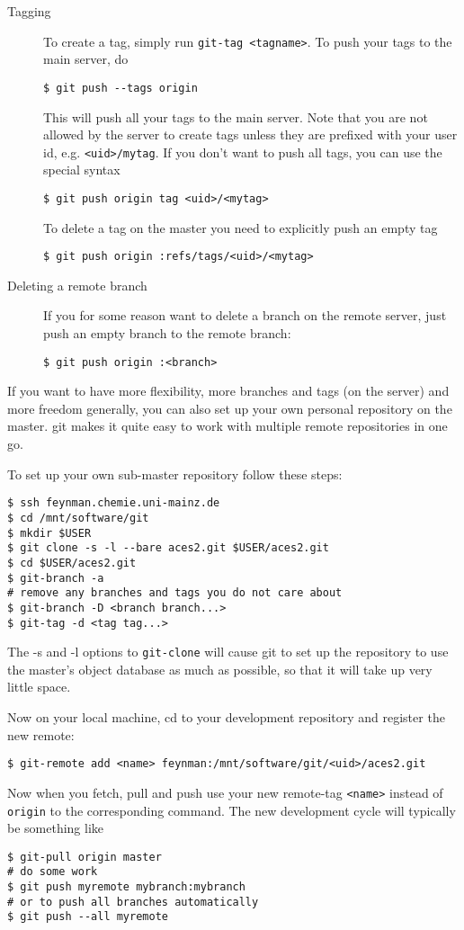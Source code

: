 \documentclass[a4paper,10pt]{article}
\begin{document}
\begin{description}
\item[Tagging] To create a tag, simply run {\tt git-tag <tagname>}. To push
your tags to the main server, do
\begin{verbatim}
$ git push --tags origin 
\end{verbatim}
This will push all your tags to the main server. Note that you are not allowed
by the server to create tags unless they are prefixed with your user id, e.g. 
{\tt <uid>/mytag}. If you don't want to push all tags, you can use the special
syntax
\begin{verbatim}
$ git push origin tag <uid>/<mytag>
\end{verbatim}
To delete a tag on the master you need to explicitly push an empty tag
\begin{verbatim}
$ git push origin :refs/tags/<uid>/<mytag>
\end{verbatim}

\item[Deleting a remote branch] If you for some reason want to delete a branch
on the remote server, just push an empty branch to the remote branch:
\begin{verbatim}
$ git push origin :<branch>
\end{verbatim}
\end{description}

If you want to have more
flexibility, more branches and tags (on the server) and more freedom
generally, you can also set up your own personal repository on the master. git
makes it quite easy to work with multiple remote repositories in one go. 

To set up your own sub-master repository follow these steps:
\begin{verbatim}
$ ssh feynman.chemie.uni-mainz.de
$ cd /mnt/software/git
$ mkdir $USER
$ git clone -s -l --bare aces2.git $USER/aces2.git
$ cd $USER/aces2.git 
$ git-branch -a 
# remove any branches and tags you do not care about
$ git-branch -D <branch branch...>
$ git-tag -d <tag tag...>
\end{verbatim}
The -s and -l options to {\tt git-clone} will cause git to set up the
repository to use the master's object database as much as possible, so that it
will take up very little space. 

Now on your local machine, cd to your development repository and register the 
new remote:
\begin{verbatim}
$ git-remote add <name> feynman:/mnt/software/git/<uid>/aces2.git
\end{verbatim}
Now when you fetch, pull and push use your new remote-tag {\tt <name>} instead 
of {\tt origin} to the corresponding command. The new development cycle will
typically be something like
\begin{verbatim}
$ git-pull origin master
# do some work
$ git push myremote mybranch:mybranch
# or to push all branches automatically
$ git push --all myremote 
\end{verbatim}
\end{document}
